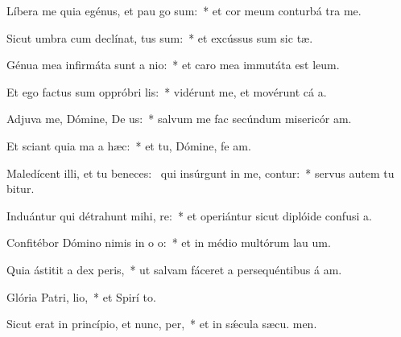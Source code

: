 \item Líbera me quia egénus, et pau go sum:~* et cor meum conturbá  tra me.
\item Sicut umbra cum declínat, tus sum:~* et excússus sum sic tæ.
\item Génua mea infirmáta sunt a nio:~* et caro mea immutáta est  leum.
\item Et ego factus sum oppróbri lis:~* vidérunt me, et movérunt cá a.
\item Adjuva me, Dómine, De us:~* salvum me fac secúndum misericór am.
\item Et sciant quia ma a hæc:~* et tu, Dómine, fe am.
\item Maledícent illi, et tu beneces:~\pscross{} qui insúrgunt in me, contur:~* servus autem tu bitur.
\item Induántur qui détrahunt mihi, re:~* et operiántur sicut diplóide confusi a.
\item Confitébor Dómino nimis in o o:~* et in médio multórum lau um.
\item Quia ástitit a dex peris,~* ut salvam fáceret a persequéntibus á am.
\item Glória Patri,  lio,~* et Spirí to.
\item Sicut erat in princípio, et nunc,  per,~* et in sǽcula sæcu. men.
